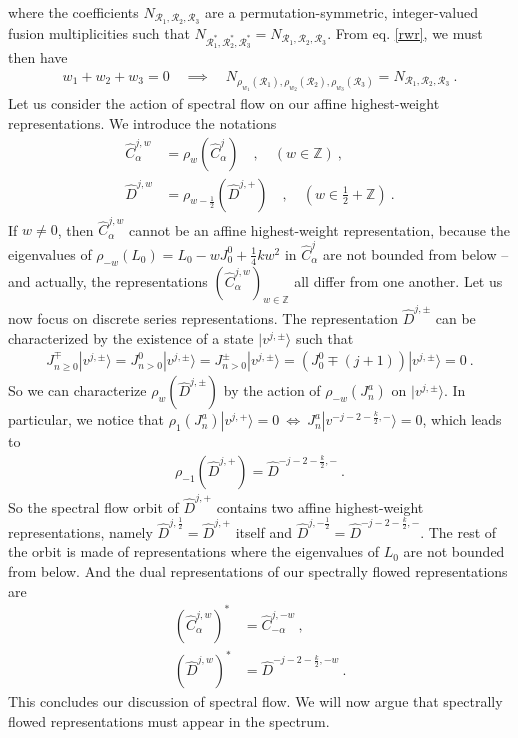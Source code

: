 \documentclass[12pt, a4paper, notitlepage, twoside]{report}
\numberwithin{equation}{section}
\theoremstyle{break}
\begin{document}
where the coefficients $N_{\mathcal{R}_1,\mathcal{R}_2,\mathcal{R}_3}$ are a permutation-symmetric, integer-valued fusion multiplicities such that $N_{\mathcal{R}_1^*,\mathcal{R}_2^*,\mathcal{R}_3^*}=N_{\mathcal{R}_1,\mathcal{R}_2,\mathcal{R}_3}$.
From eq. \eqref{rwr}, we must then have 
\begin{align}
w_1+w_2+w_3=0 \quad \implies \quad N_{\rho_{w_1}(\mathcal{R}_1),\rho_{w_2}(\mathcal{R}_2),\rho_{w_3}(\mathcal{R}_3)}=N_{\mathcal{R}_1,\mathcal{R}_2,\mathcal{R}_3}\ .
\label{nrrr} 
\end{align}
Let us consider the action of spectral flow on our affine highest-weight representations. 
We introduce the notations 
\begin{align}
 \hat{C}^{j,w}_\alpha &= \rho_w(\hat{C}^j_\alpha) \quad , \quad (w\in{\mathbb{Z}})\ ,
\\
\hat{D}^{j,w} &= \rho_{w-\frac12}(\hat{D}^{j,+})\quad , \quad (w\in \tfrac12+{\mathbb{Z}})\ .
\end{align}
If $w\neq 0$, then $\hat{C}^{j,w}_\alpha$ cannot be an affine highest-weight representation, because the eigenvalues of $\rho_{-w}(L_0) = L_0-w J^0_0 +\frac14 kw^2$ in $\hat{C}^j_\alpha$ are not bounded from below -- and actually, the representations $(\hat{C}^{j,w}_\alpha)_{w\in{\mathbb{Z}}}$ all differ from one another.
Let us now focus on discrete series representations.
The representation $\hat{D}^{j,\pm}$ can be characterized by the existence of a state $|v^{j,\pm}\rangle$ such that 
\begin{align}
J^\mp_{n\geq 0}|v^{j,\pm}\rangle = J^0_{n>0}|v^{j,\pm}\rangle =  J^\pm_{n>0}|v^{j,\pm}\rangle = (J^0_0\mp(j+1))|v^{j,\pm}\rangle = 0\ .
\end{align}
So we can characterize $\rho_w(\hat{D}^{j,\pm})$ by the action of $\rho_{-w}(J^a_n)$ on $|v^{j,\pm}\rangle$.
In particular, we notice that $\rho_1(J^a_n)|v^{j,+}\rangle = 0 \ \iff \ J^a_n|v^{-j-2-\frac{k}{2},-}\rangle=0$, which leads to 
\begin{align}
 \rho_{-1}(\hat{D}^{j,+}) = \hat{D}^{-j-2-\frac{k}{2},-} \ .
\label{rdd}
\end{align}
So the spectral flow orbit of $\hat{D}^{j,+}$ contains two affine highest-weight representations, namely $\hat{D}^{j,\frac12} = \hat{D}^{j,+}$ itself and $\hat{D}^{j,-\frac12} = \hat{D}^{-j-2-\frac{k}{2},-}$.
The rest of the orbit is made of representations where the eigenvalues of $L_0$ are not bounded from below. 
And the dual representations of our spectrally flowed representations are
\begin{align}
 (\hat{C}^{j,w}_{\alpha})^* &= \hat{C}^{j,-w}_{-\alpha}\ ,
\label{cjwd}
\\
(\hat{D}^{j,w})^* &= \hat{D}^{-j-2-\frac{k}{2},-w}\ .
\label{djwd}
\end{align}
This concludes our discussion of spectral flow.
We will now argue that spectrally flowed representations must appear in the spectrum. 
\end{document}
